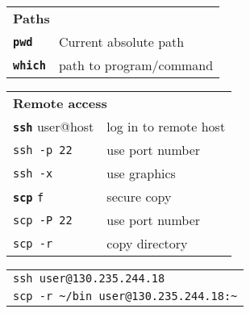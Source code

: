 \documentclass[a4paper,10pt,landscape]{report}
\newcommand{\boxtitle}[1]{{\textbf{\color{RubineRed}#1}}}
\newcommand{\example}[1]{{\texttt{\color{RubineRed}#1}}}
\newcommand{\labbr}[1]{{\texttt{\color{Red}#1}}}
\newcommand{\co}[1]{\texttt{#1}}
\newcommand{\cob}[1]{\texttt{\textbf{#1}}} %
\begin{document}
\begin{multicols}{4}
\begin{mdframed}[style=mybox]
\begin{tabular}{ l l }
\multicolumn{2}{l}{\boxtitle{Paths}}\\
\cob{pwd}     & Current absolute path\\
\cob{which}   & path to program/command\\
\end{tabular}
\end{mdframed}

\begin{mdframed}[style=mybox]
\begin{tabular}{ l l }
\multicolumn{2}{l}{\boxtitle{Remote access}} \\
\cob{ssh} user@host  & log in to remote host \\
\co{ssh -p 22}       & use port number \\
\co{ssh -x}          & use graphics \\
\cob{scp} \labbr{f}     & secure copy\\
\co{scp -P 22}       & use port number \\
\co{scp -r}          & copy directory \\
\end{tabular}
\begin{tabular}{ l }
\example{ssh user@130.235.244.18} \\
\example{scp -r \textasciitilde/bin user@130.235.244.18:\textasciitilde} \\
\end{tabular}
\end{mdframed}


\end{multicols}
\end{document}
